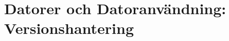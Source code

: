 \documentclass{lecturenotes}
\renewcommand{\vecka}{9}
\newcommand{\veckotema}{Mängder och tabeller, versionshantering}
\begin{document}
\frame{\titlepage}
\setnextsection{\vecka}
\section[Vecka \vecka: \veckotema]{Datorer och Datoranvändning: Versionshantering}
\frame{\tableofcontents}


\end{document}
